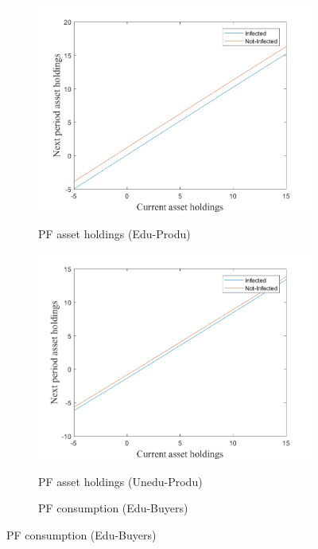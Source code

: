 \begin{figure}[H]
\bigskip
\begin{subfigure}{0.5\textwidth}\caption{PF asset holdings (Edu-Produ)}
   \includegraphics[width=\linewidth,height = 0.22\textheight]{figures/mio/FIG3.png}
    \label{fig_dert}
\end{subfigure}
\hspace*{\fill}
\begin{subfigure}{0.5\textwidth}\caption{PF asset holdings (Unedu-Produ)}
   \includegraphics[width=\linewidth,height = 0.22\textheight]{figures/mio/FIG4.png}
    \label{fig:x_b}
\end{subfigure}
\bigskip
\begin{subfigure}{0.5\textwidth}\caption{PF consumption (Edu-Buyers)}

\end{subfigure}
\end{figure}
